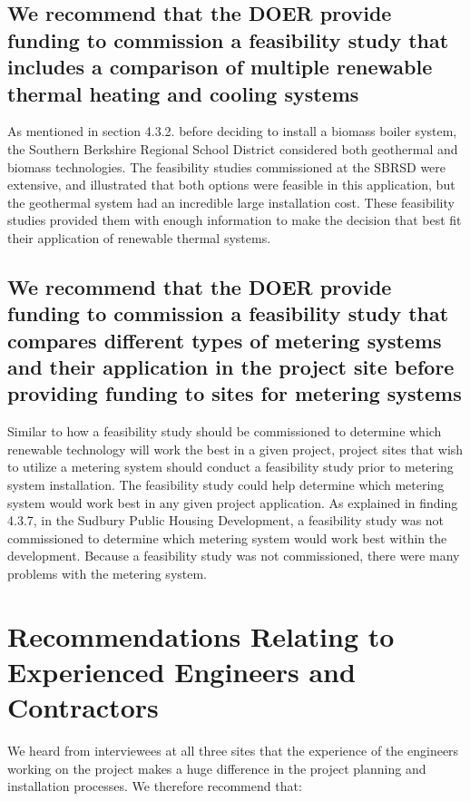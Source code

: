 \subsection{We recommend that the DOER provide funding to commission a feasibility study that includes a comparison of multiple renewable thermal heating and cooling systems}
\par As mentioned in section 4.3.2. before deciding to install a biomass boiler system, the Southern Berkshire Regional School District considered both geothermal and biomass technologies. The feasibility studies commissioned at the SBRSD were extensive, and illustrated that both options were feasible in this application, but the geothermal system had an incredible large installation cost. These feasibility studies provided them with enough information to make the decision that best fit their application of renewable thermal systems. 

\subsection{We recommend that the DOER provide funding to commission a feasibility study that compares different types of metering systems and their application in the project site before providing funding to sites for metering systems}
\par Similar to how a feasibility study should be commissioned to determine which renewable technology will work the best in a given project, project sites that wish to utilize a metering system should conduct a feasibility study prior to metering system installation. The feasibility study could help determine which metering system would work best in any given project application. As explained in finding 4.3.7, in the Sudbury Public Housing Development, a feasibility study was not commissioned to determine which metering system would work best within the development. Because a feasibility study was not commissioned, there were many problems with the metering system. 

\section{Recommendations Relating to Experienced Engineers and Contractors}
\par We heard from interviewees at all three sites that the experience of the engineers working on the project makes a huge difference in the project planning and installation processes. We therefore recommend that:
